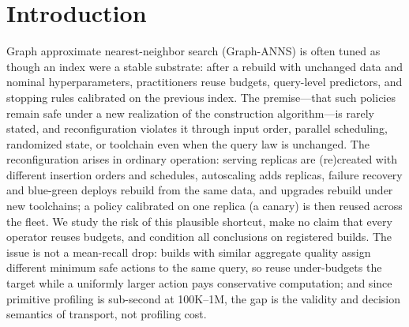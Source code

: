 \documentclass{article}
\begin{document}
\begin{abstract}
angular: 6.47\% at the $k{=}7$ resolution limit $\alpha{=}0.125$), and at farm depth
($k{=}49$: 0.72\%))---but the guarantee's pool requirement grows with scale: at 10M, $k{=}7$ still
leaves 23.3\% uncached-transport risk and pooling converges to the naive level; a learned query-level predictor fails to
transfer across builds (risk 21--24\%, transfer $R^2 = 0.015$). Fixing input order and single-threaded construction eliminates measured transport
risk with $1.71$--$3.52\times$ build overhead; order pinning alone halves response variation at no build-time
cost. Primitive profiling remains cheap at both scales, so we claim neither universal profiling cost nor
open-world recovery.
\end{abstract}

\section{Introduction}
\label{sec:intro}

Graph approximate nearest-neighbor search (Graph-ANNS) is often tuned as though an index were a stable
substrate: after a rebuild with unchanged data and nominal hyperparameters, practitioners reuse budgets,
query-level predictors, and stopping rules calibrated on the previous index. The premise---that such
policies remain safe under a new realization of the construction algorithm---is rarely stated, and
reconfiguration violates it through input order, parallel scheduling, randomized state, or toolchain even
when the query law is unchanged. The reconfiguration arises in ordinary operation: serving replicas are
(re)created with different insertion orders and schedules, autoscaling adds replicas, failure recovery and
blue-green deploys rebuild from the same data, and upgrades rebuild under new toolchains; a policy
calibrated on one replica (a canary) is then reused across the fleet. We study the risk of this plausible
shortcut, make no claim that every operator reuses budgets, and condition all conclusions on registered
builds. The issue is not a mean-recall drop: builds with similar aggregate quality assign different
minimum safe actions to the same query, so reuse under-budgets the target while a uniformly larger action
pays conservative computation; and since primitive profiling is sub-second at 100K--1M, the gap is the
validity and decision semantics of transport, not profiling cost.
\end{document}
